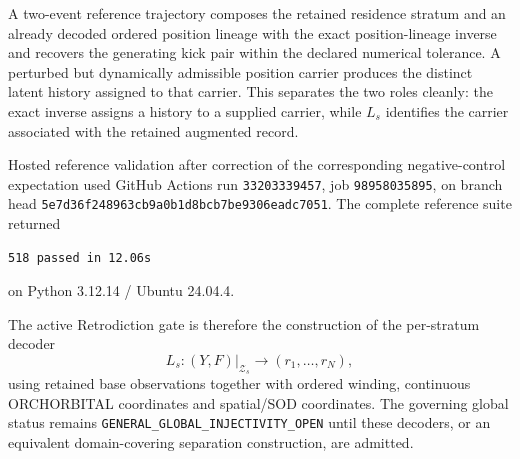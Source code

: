 A two-event reference trajectory composes the retained residence stratum and an already decoded ordered position lineage with the exact position-lineage inverse and recovers the generating kick pair within the declared numerical tolerance. A perturbed but dynamically admissible position carrier produces the distinct latent history assigned to that carrier. This separates the two roles cleanly: the exact inverse assigns a history to a supplied carrier, while $L_s$ identifies the carrier associated with the retained augmented record.

Hosted reference validation after correction of the corresponding negative-control expectation used GitHub Actions run \texttt{33203339457}, job \texttt{98958035895}, on branch head \texttt{5e7d36f248963cb9a0b1d8bcb7be9306eadc7051}. The complete reference suite returned
\begin{verbatim}
518 passed in 12.06s
\end{verbatim}
on Python 3.12.14 / Ubuntu 24.04.4.

The active Retrodiction gate is therefore the construction of the per-stratum decoder
\[
\boxed{
L_s:(Y,F)|_{\mathcal Z_s}\longrightarrow(r_1,\ldots,r_N),
}
\]
using retained base observations together with ordered winding, continuous ORCHORBITAL coordinates and spatial/SOD coordinates. The governing global status remains \texttt{GENERAL\_GLOBAL\_INJECTIVITY\_OPEN} until these decoders, or an equivalent domain-covering separation construction, are admitted.

